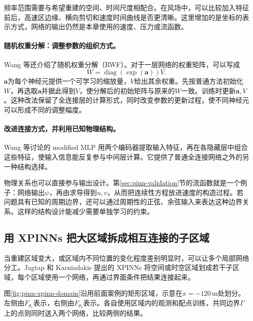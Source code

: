 频率范围需要与希望重建的空间、时间尺度相配合。在风场中，可以比较加入特征前后，高速区边缘、横向剪切和速度时间曲线是否更清晰。这里增加的是坐标的表示方式，网络的输出仍然是本章使用的速度、压力或流函数。

\paragraph{随机权重分解：调整参数的组织方式。}
Wang 等还介绍了随机权重分解（RWF）。对于一层网络的权重矩阵，可以写成
\begin{equation}
 W=\operatorname{diag}(\exp(\mathbf a))V.
 \label{eq:pinn-rwf}
\end{equation}
$\mathbf a$为每个神经元提供一个可学习的缩放量，$V$给出其余权重。先按普通方法初始化$W$，再选取$\mathbf a$并据此得到$V$，使分解后的初始矩阵与原来的$W$一致。训练时更新$\mathbf a,V$。这种改法保留了全连接层的计算形式，同时改变参数的更新过程，使不同神经元可以形成不同的调整幅度。

\paragraph{改进连接方式，并利用已知物理结构。}
Wang 等讨论的 modified MLP 用两个编码器提取输入特征，再在各隐藏层中组合这些特征，使输入信息能反复参与中间层计算。它提供了普通全连接网络之外的另一种结构选择\cite{wang2023expert}。

物理关系也可以直接参与输出设计。第\ref{sec:pinn-validation}节的流函数就是一个例子：网络输出$\psi$，再由求导得到$u,v$，从而把连续性方程放进速度的构造过程。若问题具有已知的周期边界，还可以通过周期性的正弦、余弦输入来表达这种边界关系。这样的结构设计能减少需要单独学习的约束。

\subsection{用 XPINNs 把大区域拆成相互连接的子区域}
当重建区域变大，或区域内不同位置的变化程度差别明显时，可以让多个局部网络分工。Jagtap 和 Karniadakis 提出的 XPINNs 将空间或时空区域划成若干子区域，每个区域使用一个网络，再通过界面条件把结果连接起来\cite{jagtap2020xpinn}。

图\ref{fig:pinn-xpinn-domain}沿用前面案例的矩形区域，示意在$x=-120\,\mathrm{m}$处划分。左侧由$F_{\theta_1}$表示，右侧由$F_{\theta_2}$表示。各自使用区域内的观测和配点训练，共同边界$\Gamma$上的点则同时送入两个网络，比较两侧的结果。

